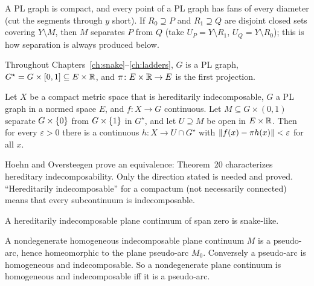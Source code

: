 
A PL graph is compact, and every point of a PL graph has fans of every diameter (cut the segments through $y$ short). If $R_0\supseteq P$ and $R_1\supseteq
Q$ are disjoint closed sets covering $Y\setminus M$, then $M$ separates $P$ from $Q$ (take $U_P=Y\setminus R_1$, $U_Q=Y\setminus R_0$); this is how
separation is always produced below.


Throughout Chapters~\ref{ch:snake}--\ref{ch:ladders}, $G$ is a PL graph, $G^\star=G\times[0,1]\subseteq E\times\mathbb{R}$, and $\pi\colon E\times\mathbb{R}\to E$ is the
first projection.

\begin{theorem}\label{thm:ho20}
Let $X$ be a compact metric space that is hereditarily indecomposable, $G$ a PL graph in a normed space $E$, and $f\colon X\to G$ continuous.
Let $M\subseteq G\times(0,1)$ separate $G\times\left\{ 0 \right\}$ from $G\times\left\{ 1 \right\}$ in $G^\star$, and let $U\supseteq M$ be open in $E\times\mathbb{R}$. Then for every $\varepsilon>0$
there is a continuous $h\colon X\to U\cap G^\star$ with $\lVert f(x)-\pi h(x)\rVert<\varepsilon$ for all $x$.
\end{theorem}


Hoehn and Oversteegen prove an equivalence: Theorem~20 characterizes hereditary indecomposability. Only the direction stated is needed and
proved. ``Hereditarily indecomposable'' for a compactum (not necessarily connected) means that every subcontinuum is indecomposable.

\begin{theorem}\label{thm:ho1}
A hereditarily indecomposable plane continuum of span zero is snake-like.
\end{theorem}


\begin{theorem}\label{thm:indec-pseudoarc}
A nondegenerate homogeneous indecomposable plane continuum $M$ is a pseudo-arc, hence homeomorphic to the plane pseudo-arc $M_0$. Conversely
a pseudo-arc is homogeneous and indecomposable. So a nondegenerate plane continuum is homogeneous and indecomposable iff it is a pseudo-arc.
\end{theorem}

